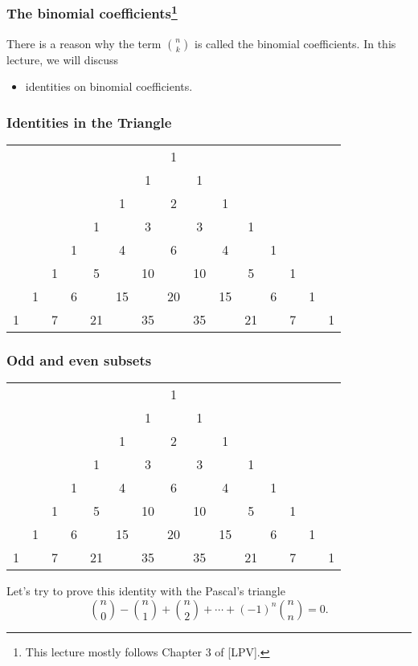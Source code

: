 

\begin{frame}\frametitle{The binomial coefficients\footnote{This lecture mostly follows Chapter 3 of [LPV].}}
  There is a reason why the term $\binom{n}{k}$ is called the binomial
  coefficients.  In this lecture, we will discuss
  \begin{itemize}
  \item identities on binomial coefficients.
  \end{itemize}
\end{frame}

\begin{frame}\frametitle{Identities in the Triangle}
  \begin{tcolorbox}
    {\footnotesize
      \begin{tabular}{ccccccccccccccc}
        & & & & & & & 1 & & & & & & & \\
        & & & & & & 1 & & 1 & & & & & & \\
        & & & & & 1 & & 2 & & 1 & & & & & \\
        & & & & 1 & & 3 & & 3 & & 1 & & & & \\
        & & & 1 & & 4 & & 6 & & 4 & & 1 & & & \\
        & & 1 & & 5 & & 10 & & 10 & & 5 & & 1 & & \\
        & 1 & & 6 & & 15 & & 20 & & 15 & & 6 & & 1 & \\
        1 & & 7 & & 21 & & 35 & & 35 & & 21 & & 7 & & 1 \\
      \end{tabular}
    }
    \vspace{0.2in}
  \end{tcolorbox}
\end{frame}

\begin{frame}\frametitle{Odd and even subsets}
  \begin{tcolorbox}
    {\footnotesize
      \begin{tabular}{ccccccccccccccc}
        & & & & & & & 1 & & & & & & & \\
        & & & & & & 1 & & 1 & & & & & & \\
        & & & & & 1 & & 2 & & 1 & & & & & \\
        & & & & 1 & & 3 & & 3 & & 1 & & & & \\
        & & & 1 & & 4 & & 6 & & 4 & & 1 & & & \\
        & & 1 & & 5 & & 10 & & 10 & & 5 & & 1 & & \\
        & 1 & & 6 & & 15 & & 20 & & 15 & & 6 & & 1 & \\
        1 & & 7 & & 21 & & 35 & & 35 & & 21 & & 7 & & 1 \\
      \end{tabular}
    }
  \end{tcolorbox}

  Let's try to prove this identity with the Pascal's triangle
  \[
  {n\choose 0} - {n\choose 1} + {n\choose 2} +\cdots +(-1)^{n}{n\choose n} = 0.
  \]
\end{frame}

